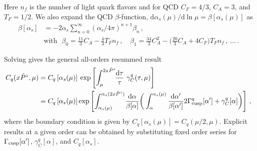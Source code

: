 \documentclass[11pt,a4paper]{article}
\newcommand{\df}{\mathrm{d}}
\newcommand{\nn}{\nonumber}
\begin{document}
Here $n_f$ is the number of light quark flavors and for QCD $C_F=4/3$, $C_A=3$, and $T_F=1/2$. We also expand the QCD $\beta$-function, $\df\alpha_s(\mu)/\df\ln\mu = \beta[\alpha_s(\mu)]$ as
\begin{align}
 \beta[\alpha_s] &= -2 \alpha_s \sum_{n=0}^\infty (\alpha_s/4\pi)^{n+1}\beta_n
  \,,
  \\
 & \text{with}\ \ \
 \beta_0 =\frac{11}{3} C_A -\frac{4}{3} T_F n_f \,, \quad
 \beta_1 =\frac{34}{3} C_A^2 - \Big(\frac{20}{3} C_A + 4 C_F\Big) T_F n_f \,, 
 \: \ldots \,.
  \nn
\end{align}

Solving  gives the general all-orders resummed result 
\begin{align} \label{eq:Cqresum}
	C_q(x \tilde P^z, \mu) &= C_q\left[\alpha_s(\mu)\right] \:
    \exp\left[ \int_{\mu}^{2x\tilde P^z}\!\! \frac{\df\tau}{\tau}\ \gamma_C^q(\tau,\mu) \right] 
  \\
  &= C_q\left[\alpha_s(\mu)\right] 
   \exp\left[ \int^{\alpha_s(2x\tilde P^z)}_{\alpha_s(\mu)} \!
   \frac{\df\alpha}{\beta[\alpha]} \bigg( \int_{\alpha}^{\alpha_s(\mu)}
  \frac{\df\alpha'}{\beta[\alpha']} 2\Gamma_{\rm cusp}^q[\alpha'] + \gamma_C^q[\alpha] \bigg)
  \right]
  \,, \nn
\end{align}
where the boundary condition is given by $C_q\left[\alpha_s(\mu)\right] = C_q(\mu/2, \mu)$. Explicit results at a given order can be obtained by substituting fixed order series for $\Gamma_{\rm cusp}[\alpha']$, $\gamma_C^q[\alpha]$, and $C_q[\alpha_s]$.
\end{document}
